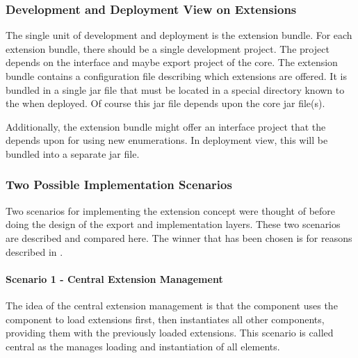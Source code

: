 
\subsubsection{Development and Deployment View on Extensions}
\label{sec:DevelopmentandDeploymentViewonExtensions}

The single unit of development and deployment is the extension bundle. For each extension bundle, there should be a single development project. The project depends on the interface and maybe export project of the \LibName{} core. The extension bundle contains a configuration file describing which extensions are offered. It is bundled in a single jar file that must be located in a special directory known to the \COMPextensionManagement{} when deployed. Of course this jar file depends upon the \LibName{} core jar file(s).

Additionally, the extension bundle might offer an interface project that the \ACTORuser{} depends upon for using new enumerations. In deployment view, this will be bundled into a separate jar file.


\subsubsection{Two Possible Implementation Scenarios}
\label{sec:TwoPossibleImplementationScenarios}

Two scenarios for implementing the \LibName{} extension concept were thought of before doing the design of the export and implementation layers. These two scenarios are described and compared here. The winner that has been chosen is  for reasons described in .


\paragraph{Scenario 1 - Central Extension Management}
\label{sec:Scenario1CentralExtensionManagement}

The idea of the central extension management is that the \COMPcontext{} component uses the \COMPextensionManagement{} component to load extensions first, then instantiates all other components, providing them with the previously loaded extensions. This scenario is called central as the \COMPcontext{} manages loading and instantiation of all elements.


